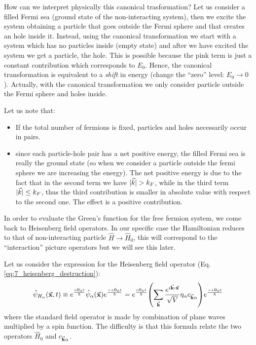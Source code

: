 \documentclass[../main/main.tex]{subfiles}
\begin{document}
How can we interpret physically this canonical trasformation?
Let us consider a filled Fermi sea (ground state of the non-interacting system), then we excite the system obtaining a particle that goes outside the Fermi sphere and that creates an hole inside it.
Instead, using the canonical transformation we start with a system which has no particles inside (empty state) and after we have excited the system we get a particle, the hole. This is possible because the pink term is just a constant contribution which corresponds to \( E_0 \).
Hence, the canonical transformation is equivalent to a \emph{shift} in energy (change the “zero” level: \( E_0 \rightarrow 0 \)).
Actually, with the canonical transformation we only consider particle outside the Fermi sphere and holes inside.

Let us note that:
\begin{itemize}
\item If the total number of fermions is fixed, particles and holes necessarily occur in pairs.
\item since each particle-hole pair has a net positive energy, the filled Fermi sea is really the ground state (so when we consider a particle outside the fermi sphere we are increasing the energy).
The net positive energy is due to the fact that in the second term we have \( \absvec{k}> k_F \), while in the third term \( | \vec{k} |\le k_F \), thus the third contribution is smaller in absolute value with respect to the second one. The effect is a positive contribution.
\end{itemize}

In order to evaluate the Green's function for the free fermion system,  we come back to Heisenberg field operators.
In our specific case the Hamiltonian reduces to that of non-interacting particle  \( \hat{H}\rightarrow \hat{H}_0   \), this will correspond to the “interaction” picture operators but we will see this later.

Let us consider the expression for the Heisenberg field operator (Eq.\eqref{eq:7_heisenberg_destruction}):
\begin{equation*}
   \hat{\psi }_{H_ \alpha } (\va{x},t) \equiv e^{\frac{i \hat{H}_0 t}{\hbar }} \hat{\psi }_ \alpha  (\va{x}) e^{\frac{- i \hat{H}_0 t}{\hbar }} =
   e^{\frac{i \hat{H}_0 t}{\hbar }} \qty(
   \sum_{\va{k}}^{} \frac{e^{i \va{k}\vdot \va{x}} }{\sqrt{V} } \eta _ \alpha c_{\va{k}\alpha }
   )  e^{\frac{- i \hat{H}_0 t}{\hbar }}
\end{equation*}
where the standard field operator is made by combination of plane waves multiplied by a spin function.
The difficulty is that this formula relate the two operators \( \hat{H}_0  \) and \( c_{\va{k}\alpha }  \).
\end{document}
